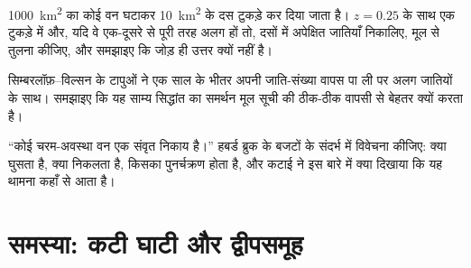 \begin{exercise}[$\star\star\star$]\label{exo:b1:ecosystem-dynamics:10}
\qty{1000}{km^2} का कोई वन घटाकर \qty{10}{km^2} के दस टुकड़े कर दिया
जाता है। $z = 0.25$ के साथ एक टुकड़े में और, यदि वे एक-दूसरे से पूरी तरह
अलग हों तो, दसों में अपेक्षित जातियाँ निकालिए, मूल से तुलना कीजिए, और
समझाइए कि जोड़ ही उत्तर क्यों नहीं है।
\end{exercise}

\begin{exercise}[$\star\star\star$]\label{exo:b1:ecosystem-dynamics:11}
सिम्बरलॉफ़--विल्सन के टापुओं ने एक साल के भीतर अपनी जाति-संख्या वापस पा
ली पर अलग जातियों के साथ। समझाइए कि यह साम्य सिद्धांत का समर्थन मूल सूची
की ठीक-ठीक वापसी से बेहतर क्यों करता है।
\end{exercise}

\begin{exercise}[$\star\star\star$]\label{exo:b1:ecosystem-dynamics:12}
``कोई चरम-अवस्था वन एक संवृत निकाय है।'' हबर्ड ब्रुक के बजटों के संदर्भ
में विवेचना कीजिए: क्या घुसता है, क्या निकलता है, किसका पुनर्चक्रण होता
है, और कटाई ने इस बारे में क्या दिखाया कि यह थामना कहाँ से आता है।
\end{exercise}

\section{समस्या: कटी घाटी और द्वीपसमूह}

